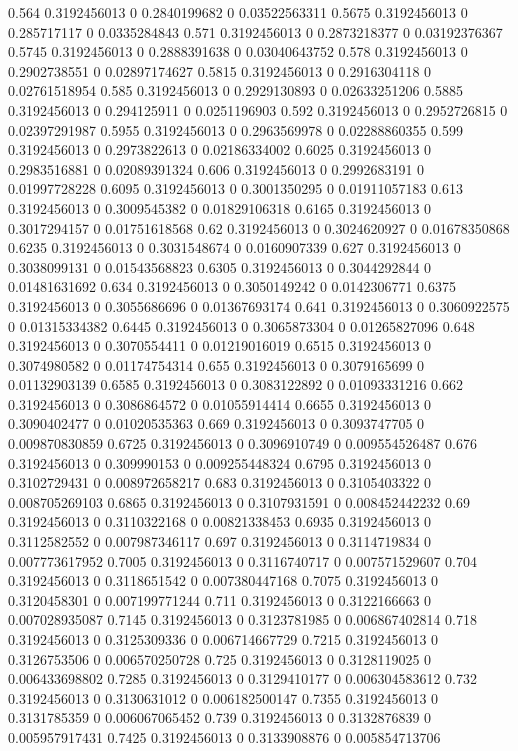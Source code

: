 {0.564 0.3192456013 0 0.2840199682 0 0.03522563311
0.5675 0.3192456013 0 0.285717117 0 0.0335284843
0.571 0.3192456013 0 0.2873218377 0 0.03192376367
0.5745 0.3192456013 0 0.2888391638 0 0.03040643752
0.578 0.3192456013 0 0.2902738551 0 0.02897174627
0.5815 0.3192456013 0 0.2916304118 0 0.02761518954
0.585 0.3192456013 0 0.2929130893 0 0.02633251206
0.5885 0.3192456013 0 0.294125911 0 0.0251196903
0.592 0.3192456013 0 0.2952726815 0 0.02397291987
0.5955 0.3192456013 0 0.2963569978 0 0.02288860355
0.599 0.3192456013 0 0.2973822613 0 0.02186334002
0.6025 0.3192456013 0 0.2983516881 0 0.02089391324
0.606 0.3192456013 0 0.2992683191 0 0.01997728228
0.6095 0.3192456013 0 0.3001350295 0 0.01911057183
0.613 0.3192456013 0 0.3009545382 0 0.01829106318
0.6165 0.3192456013 0 0.3017294157 0 0.01751618568
0.62 0.3192456013 0 0.3024620927 0 0.01678350868
0.6235 0.3192456013 0 0.3031548674 0 0.0160907339
0.627 0.3192456013 0 0.3038099131 0 0.01543568823
0.6305 0.3192456013 0 0.3044292844 0 0.01481631692
0.634 0.3192456013 0 0.3050149242 0 0.0142306771
0.6375 0.3192456013 0 0.3055686696 0 0.01367693174
0.641 0.3192456013 0 0.3060922575 0 0.01315334382
0.6445 0.3192456013 0 0.3065873304 0 0.01265827096
0.648 0.3192456013 0 0.3070554411 0 0.01219016019
0.6515 0.3192456013 0 0.3074980582 0 0.01174754314
0.655 0.3192456013 0 0.3079165699 0 0.01132903139
0.6585 0.3192456013 0 0.3083122892 0 0.01093331216
0.662 0.3192456013 0 0.3086864572 0 0.01055914414
0.6655 0.3192456013 0 0.3090402477 0 0.01020535363
0.669 0.3192456013 0 0.3093747705 0 0.009870830859
0.6725 0.3192456013 0 0.3096910749 0 0.009554526487
0.676 0.3192456013 0 0.309990153 0 0.009255448324
0.6795 0.3192456013 0 0.3102729431 0 0.008972658217
0.683 0.3192456013 0 0.3105403322 0 0.008705269103
0.6865 0.3192456013 0 0.3107931591 0 0.008452442232
0.69 0.3192456013 0 0.3110322168 0 0.00821338453
0.6935 0.3192456013 0 0.3112582552 0 0.007987346117
0.697 0.3192456013 0 0.3114719834 0 0.007773617952
0.7005 0.3192456013 0 0.3116740717 0 0.007571529607
0.704 0.3192456013 0 0.3118651542 0 0.007380447168
0.7075 0.3192456013 0 0.3120458301 0 0.007199771244
0.711 0.3192456013 0 0.3122166663 0 0.007028935087
0.7145 0.3192456013 0 0.3123781985 0 0.006867402814
0.718 0.3192456013 0 0.3125309336 0 0.006714667729
0.7215 0.3192456013 0 0.3126753506 0 0.006570250728
0.725 0.3192456013 0 0.3128119025 0 0.006433698802
0.7285 0.3192456013 0 0.3129410177 0 0.006304583612
0.732 0.3192456013 0 0.3130631012 0 0.006182500147
0.7355 0.3192456013 0 0.3131785359 0 0.006067065452
0.739 0.3192456013 0 0.3132876839 0 0.005957917431
0.7425 0.3192456013 0 0.3133908876 0 0.005854713706
}
